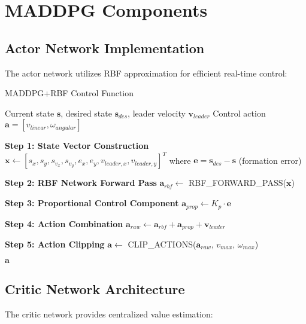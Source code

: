 \documentclass[11pt,a4paper]{article}
\newcommand{\vect}[1]{\boldsymbol{#1}}
\begin{document}
\section{MADDPG Components}

\subsection{Actor Network Implementation}

The actor network utilizes RBF approximation for efficient real-time control:

\begin{algorithm}[H]
\caption{MADDPG+RBF Control Function}
\label{alg:control}
\begin{algorithmic}[1]
\Require Current state $\vect{s}$, desired state $\vect{s}_{des}$, leader velocity $\vect{v}_{leader}$
\Ensure Control action $\vect{a} = [v_{linear}, \omega_{angular}]$

\State \textbf{Step 1: State Vector Construction}
\State $\vect{x} \leftarrow [s_x, s_y, s_{v_x}, s_{v_y}, e_x, e_y, v_{leader,x}, v_{leader,y}]^T$
\State where $\vect{e} = \vect{s}_{des} - \vect{s}$ (formation error)

\State \textbf{Step 2: RBF Network Forward Pass}
\State $\vect{a}_{rbf} \leftarrow$ RBF\_FORWARD\_PASS($\vect{x}$)

\State \textbf{Step 3: Proportional Control Component}
\State $\vect{a}_{prop} \leftarrow K_p \cdot \vect{e}$

\State \textbf{Step 4: Action Combination}
\State $\vect{a}_{raw} \leftarrow \vect{a}_{rbf} + \vect{a}_{prop} + \vect{v}_{leader}$

\State \textbf{Step 5: Action Clipping}
\State $\vect{a} \leftarrow$ CLIP\_ACTIONS($\vect{a}_{raw}$, $v_{max}$, $\omega_{max}$)

\Return $\vect{a}$
\end{algorithmic}
\end{algorithm}

\subsection{Critic Network Architecture}

The critic network provides centralized value estimation:
\end{document}
